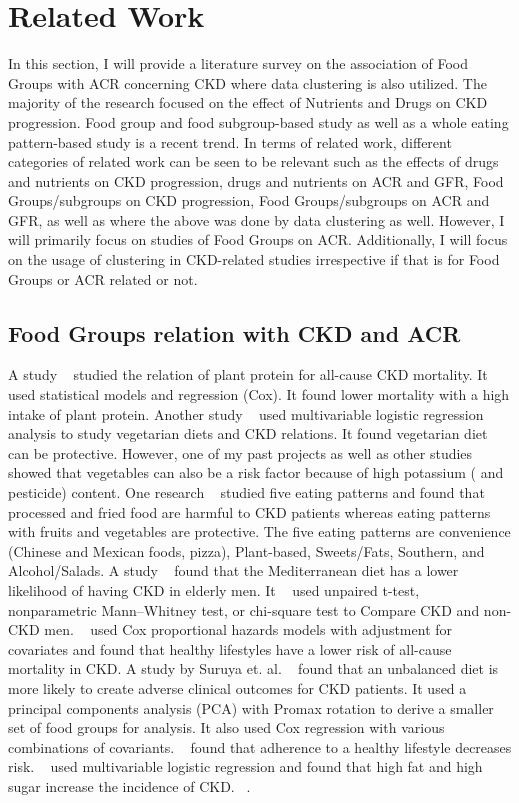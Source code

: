 \section{Related Work}

\flushleft \justifying In this section, I will provide a literature survey on the association of Food Groups with ACR concerning CKD where data clustering is also utilized. The majority of the research focused on the effect of Nutrients and Drugs on CKD progression. Food group and food subgroup-based study as well as a whole eating pattern-based study is a recent trend. In terms of related work, different categories of related work can be seen to be relevant such as the effects of drugs and nutrients on CKD progression, drugs and nutrients on ACR and GFR, Food Groups/subgroups on CKD progression, Food Groups/subgroups on ACR and GFR, as well as where the above was done by data clustering as well. However, I will primarily focus on studies of Food Groups on ACR. Additionally, I will focus on the usage of clustering in CKD-related studies irrespective if that is for Food Groups or ACR related or not.

\subsection{Food Groups relation with CKD and ACR}
\flushleft \justifying A study ~\cite{Chen2016} studied the relation of plant protein for all-cause CKD mortality. It used statistical models and regression (Cox). It found lower mortality with a high intake of plant protein. Another study ~\cite{Liu2019} used multivariable logistic regression analysis to study vegetarian diets and CKD relations. It found vegetarian diet can be protective. However, one of my past projects as well as other studies ~\cite{Aleix2019} showed that vegetables can also be a risk factor because of high potassium ( and pesticide) content. One research ~\cite{Gutierrez2014} studied five eating patterns and found that processed and fried food are harmful to CKD patients whereas eating patterns with fruits and vegetables are protective. The five eating patterns are convenience (Chinese and Mexican foods, pizza), Plant-based, Sweets/Fats, Southern, and Alcohol/Salads. A study ~\cite{Huang2013} found that the Mediterranean diet has a lower likelihood of having CKD in elderly men. It ~\cite{Huang2013} used unpaired t-test, nonparametric Mann–Whitney test, or chi-square test to Compare CKD and non-CKD men. ~\cite{Ricardo2013} used Cox proportional hazards models with adjustment for covariates and found that healthy lifestyles have a lower risk of all-cause mortality in CKD. A study by Suruya et. al. ~\cite{Tsuruya2015} found that an unbalanced diet is more likely to create adverse clinical outcomes for CKD patients. It used a principal components analysis (PCA) with Promax rotation to derive a smaller set of food groups for analysis. It also used Cox regression with various combinations of covariants. ~\cite{Ricardo2015} found that adherence to a healthy lifestyle decreases risk. ~\cite{Asghari} used multivariable logistic regression and found that high fat and high sugar increase the incidence of CKD. ~\cite{Ahmed2019}.

